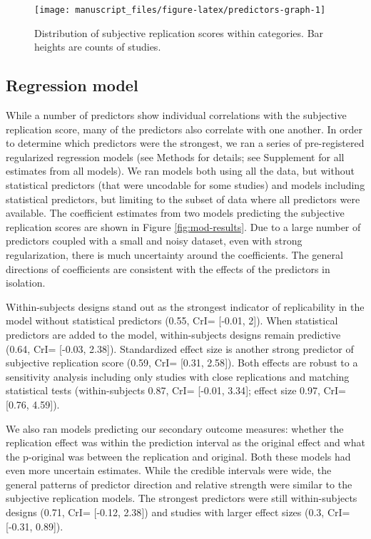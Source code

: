 \documentclass[
  english,
  a4paper,
]{article}
\begin{document}
\begin{figure}[ht]
\texttt{[image: manuscript\_files/figure-latex/predictors-graph-1]} \caption{Distribution of subjective replication scores within categories. Bar heights are counts of studies.}\label{fig:predictors-graph}
\end{figure}

\hypertarget{regression-model}{%
\subsection{Regression model}\label{regression-model}}

While a number of predictors show individual correlations with the subjective replication score, many of the predictors also correlate with one another. In order to determine which predictors were the strongest, we ran a series of pre-registered regularized regression models (see Methods for details; see Supplement for all estimates from all models). We ran models both using all the data, but without statistical predictors (that were uncodable for some studies) and models including statistical predictors, but limiting to the subset of data where all predictors were available. The coefficient estimates from two models predicting the subjective replication scores are shown in Figure \ref{fig:mod-results}. Due to a large number of predictors coupled with a small and noisy dataset, even with strong regularization, there is much uncertainty around the coefficients. The general directions of coefficients are consistent with the effects of the predictors in isolation.

Within-subjects designs stand out as the strongest indicator of replicability in the model without statistical predictors (0.55, CrI= {[}-0.01, 2{]}). When statistical predictors are added to the model, within-subjects designs remain predictive (0.64, CrI= {[}-0.03, 2.38{]}). Standardized effect size is another strong predictor of subjective replication score (0.59, CrI= {[}0.31, 2.58{]}). Both effects are robust to a sensitivity analysis including only studies with close replications and matching statistical tests (within-subjects 0.87, CrI= {[}-0.01, 3.34{]}; effect size 0.97, CrI= {[}0.76, 4.59{]}).

We also ran models predicting our secondary outcome measures: whether the replication effect was within the prediction interval as the original effect and what the p-original was between the replication and original. Both these models had even more uncertain estimates. While the credible intervals were wide, the general patterns of predictor direction and relative strength were similar to the subjective replication models. The strongest predictors were still within-subjects designs (0.71, CrI= {[}-0.12, 2.38{]}) and studies with larger effect sizes (0.3, CrI= {[}-0.31, 0.89{]}).
\end{document}
